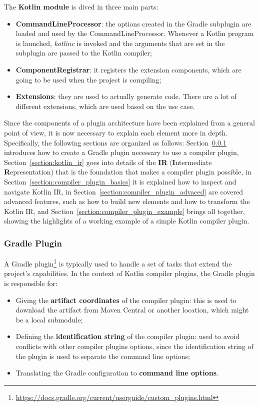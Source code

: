 \noindent The \textbf{Kotlin module} is dived in three main parts:
\begin{itemize}
    \item \textbf{CommandLineProcessor}: the options created in the Gradle subplugin are loaded and used by the CommandLineProcessor. Whenever a Kotlin program is launched, \textit{kotlinc} is invoked and the arguments that are set in the subplugin are passed to the Kotlin compiler;
    \item \textbf{ComponentRegistrar}: it registers the extension components, which are going to be used when the project is compiling;
    \item \textbf{Extensions}: they are used to actually generate code. There are a lot of different extensions, which are used based on the use case.
\end{itemize}

Since the components of a plugin architecture have been explained from a general point of view, it is now necessary to explain each element more in depth.\newline
Specifically, the following sections are organized as follows: Section~\ref{section:gradle_plugin} introduces how to create a Gradle plugin necessary to use a compiler plugin, Section~\ref{section:kotlin_ir} goes into details of the \textbf{IR} (\textbf{I}ntermediate \textbf{R}epresentation) that is the foundation that makes a compiler plugin possible, in Section~\ref{section:compiler_plugin_basics} it is explained how to inspect and navigate Kotlin IR, in Section~\ref{section:compiler_plugin_advaced} are covered advanced features, such as how to build new elements and how to transform the Kotlin IR, and Section~\ref{section:compiler_plugin_example} brings all together, showing the highlights of a working example of a simple Kotlin compiler plugin.

\subsubsection{Gradle Plugin}\label{section:gradle_plugin}
A Gradle plugin\footnote{\url{https://docs.gradle.org/current/userguide/custom_plugins.html}} is typically used to handle a set of tasks that extend the project's capabilities.\newline
In the context of Kotlin compiler plugins, the Gradle plugin is responsible for:
\begin{itemize}
    \item Giving the \textbf{artifact coordinates} of the compiler plugin: this is used to download the artifact from Maven Central or another location, which might be a local submodule;
    \item Defining the \textbf{identification string} of the compiler plugin: used to avoid conflicts with other compiler plugins options, since the identification string of the plugin is used to separate the command line options;
    \item Translating the Gradle configuration to \textbf{command line options}.
\end{itemize}

